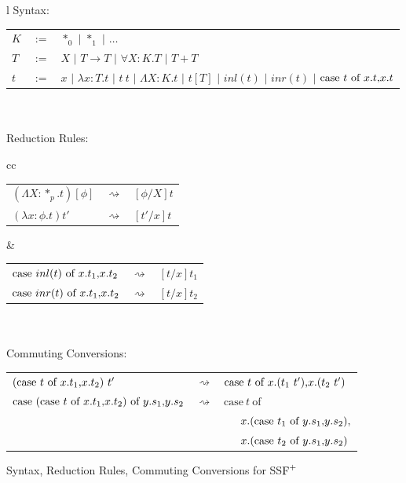 \begin{figure}
  \begin{center}
    \begin{tabular}{l}
      Syntax:\\
      \begin{tabular}{lll}
        $K$ & $:=$ & $*_0$ $|$ $*_1$             $|$ $\ldots$\\
        $T$ & $:=$ & $X$   $|$ $T \rightarrow T$ $|$ $\forall X:K.T$  $|$ $T + T$\\
        $t$ & $:=$ & $x$   $|$ $\lambda x:T.t$   $|$ $t\ t$ $|$ 
        $\Lambda X:K.t$ $|$ $t[T]$ $|$ $inl(t)$ $|$ $inr(t)$ $|$ $\mbox{case}\ t\ \text{of}\ x\text{.}t\text{,}x\text{.}t$\\
      \end{tabular}
      \\ \\
      Reduction Rules:\\
      \begin{tabular}{cc}
        \begin{tabular}{lll}
          $(\Lambda X:*_p.t)[\phi]$ & $\rightsquigarrow$ & $[\phi/X]t$\\
          $(\lambda x:\phi.t)t'$    & $\rightsquigarrow$ & $[t'/x]t$\\
        \end{tabular}
        &
        \begin{tabular}{lll}
          $\mbox{case}\ inl(t)\ \text{of}\ x\text{.}t_1\text{,}x\text{.}t_2$ & $\rightsquigarrow$ & $[t/x]t_1$\\
          $\mbox{case}\ inr(t)\ \text{of}\ x\text{.}t_1\text{,}x\text{.}t_2$ & $\rightsquigarrow$ & $[t/x]t_2$
        \end{tabular}
      \end{tabular}
      \\ \\
      Commuting Conversions:\\
      \begin{tabular}{lll}
        $(\mbox{case}\ t\ \text{of}\ x\text{.}t_1\text{,}x\text{.}t_2)\ t'$ & $\rightsquigarrow$ & 
        $\mbox{case}\ t\ \text{of}\ x\text{.}(t_1\ t')\text{,}x\text{.}(t_2\ t')$\\
        $\mbox{case}\ (\mbox{case}\ t\ \text{of}\ x\text{.}t_1\text{,}x\text{.}t_2)\ \text{of}\ y\text{.}s_1\text{,}y\text{.}s_2$ & $\rightsquigarrow$ & 
        $\mbox{case}\ t\ \mbox{of}\ $\\
        &                    & \ \ \ $x.(\mbox{case}\ t_1\ \text{of}\ y\text{.}s_1\text{,}y\text{.}s_2),$\\
        &                    & \ \ \ $x.(\mbox{case}\ t_2\ \text{of}\ y\text{.}s_1\text{,}y\text{.}s_2)$
      \end{tabular}
    \end{tabular}
  \end{center}
  
  \caption[]{Syntax, Reduction Rules, Commuting Conversions for SS$\mbox{F}^{+}$}
  \label{fig:syntax_ssfp}
\end{figure}

